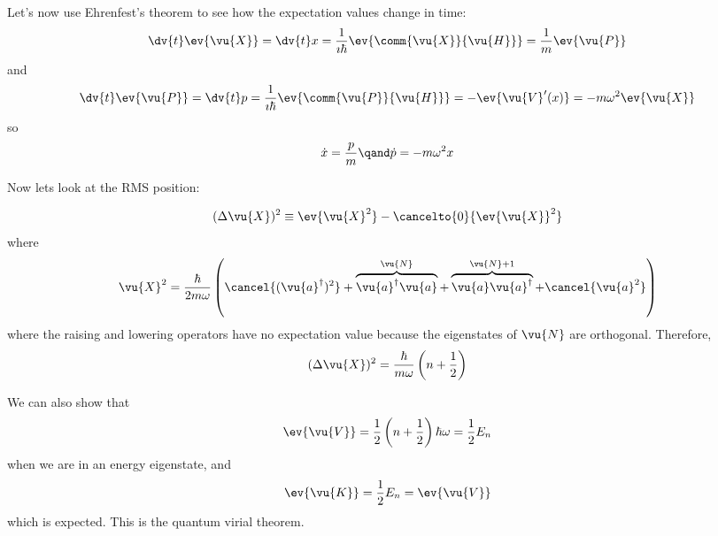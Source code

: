 \documentclass[a4paper,twoside,master.tex]{subfiles}
\begin{document}
Let's now use Ehrenfest's theorem to see how the expectation values change in time:
\begin{equation}
    \dv{t} \ev{\vu{X}} = \dv{t}x = \frac{1}{\imath \hbar} \ev{\comm{ \vu{X}}{ \vu{H}}} = \frac{1}{m} \ev{ \vu{P}}
\end{equation}
and
\begin{equation}
    \dv{t} \ev{ \vu{P}} = \dv{t}p = \frac{1}{\imath \hbar} \ev{\comm{ \vu{P}}{ \vu{H}}} = - \ev{ \vu{V}'(x)} = -m \omega^2 \ev{ \vu{X}}
\end{equation}
so
\begin{equation}
    \dot{x} = \frac{p}{m} \qand \dot{p} = -m \omega^2 x
\end{equation}

Now lets look at the RMS position:

\begin{equation}
    (\Delta \vu{X})^2 \equiv \ev{ \vu{X}^2} - \cancelto{0}{\ev{ \vu{X}}^2}
\end{equation}
where
\begin{equation}
    \vu{X}^2 = \frac{\hbar}{2m \omega} \left( \cancel{(\vu{a}^\dagger)^2} + \overbrace{ \vu{a}^\dagger \vu{a}}^{ \vu{N}} + \overbrace{ \vu{a} \vu{a}^\dagger}^{ \vu{N} + 1} + \cancel{\vu{a}^2} \right)
\end{equation}
where the raising and lowering operators have no expectation value because the eigenstates of $ \vu{N} $ are orthogonal. Therefore,
\begin{equation}
    (\Delta \vu{X})^2 = \frac{\hbar}{m \omega} \left( n + \frac{1}{2} \right)
\end{equation}

We can also show that
\begin{equation}
    \ev{ \vu{V}} = \frac{1}{2} \left( n + \frac{1}{2} \right) \hbar \omega = \frac{1}{2} E_n
\end{equation}
when we are in an energy eigenstate, and
\begin{equation}
    \ev{ \vu{K}} = \frac{1}{2} E_n = \ev{ \vu{V}}
\end{equation}
which is expected. This is the quantum virial theorem.
\end{document}
